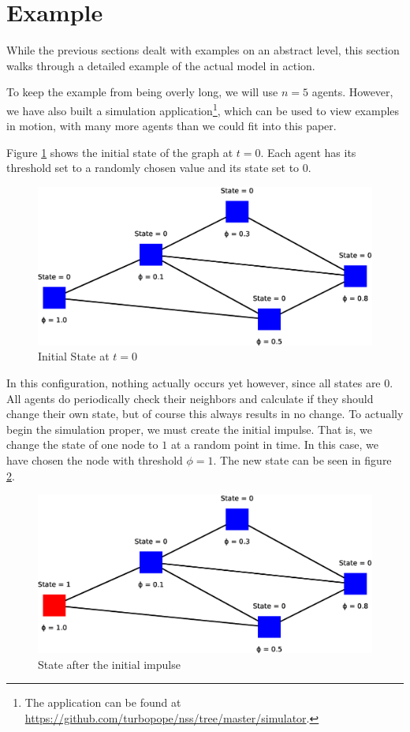 \documentclass{sig-alternate-05-2015}
\begin{document}
\section{Example}\label{sec:example}

While the previous sections dealt with examples on an abstract level, this section walks through a detailed example of the actual model in action.

To keep the example from being overly long, we will use $n = 5$ agents. However, we have also built a simulation application\footnote{The application can be found at \url{https://github.com/turbopope/nss/tree/master/simulator}.}, which can be used to view examples in motion, with many more agents than we could fit into this paper.

Figure \ref{fig:model1} shows the initial state of the graph at $t = 0$. Each agent has its threshold set to a randomly chosen value and its state set to $0$.

\begin{figure}[h!]
    \includegraphics[width=\columnwidth]{../presentation/img/model4}
    \centering
    \caption{Initial State at $t = 0$}
    \label{fig:model1}
\end{figure}

In this configuration, nothing actually occurs yet however, since all states are $0$. All agents do periodically check their neighbors and calculate if they should change their own state, but of course this always results in no change. To actually begin the simulation proper, we must create the initial impulse. That is, we change the state of one node to $1$ at a random point in time. In this case, we have chosen the node with threshold $\phi = 1$. The new state can be seen in figure \ref{fig:model2}.

\begin{figure}[h!]
    \includegraphics[width=\columnwidth]{../presentation/img/model5}
    \centering
    \caption{State after the initial impulse}
    \label{fig:model2}
\end{figure}
\end{document}
